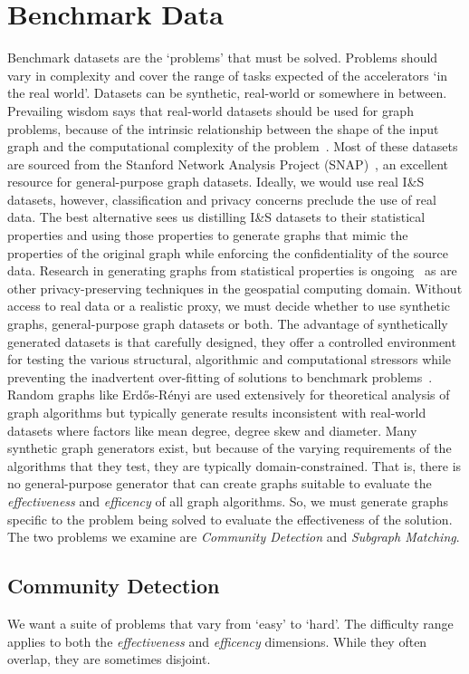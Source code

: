 \section{Benchmark Data}\label{section:datasets}
Benchmark datasets are the `problems' that must be solved.
Problems should vary in complexity and cover the range of tasks expected of the accelerators `in the real world'.
Datasets can be synthetic, real-world or somewhere in between.
Prevailing wisdom says that real-world datasets should be used for graph problems, because of the intrinsic relationship between the shape of the input graph and the computational complexity of the problem~\cite{Beamer2017}.
Most of these datasets are sourced from the Stanford Network Analysis Project (SNAP)~\cite{Leskovec2014}, an excellent resource for general-purpose graph datasets.
Ideally, we would use real I\&S datasets, however, classification and privacy concerns preclude the use of real data. 
The best alternative sees us distilling I\&S datasets to their statistical properties and using those properties to generate graphs that mimic the properties of the original graph while enforcing the confidentiality of the source data. 
Research in generating graphs from statistical properties is ongoing~\cite{Zahirnia2023} as are other privacy-preserving techniques in the geospatial computing domain.
Without access to real data or a realistic proxy, we must decide whether to use synthetic graphs, general-purpose graph datasets or both. 
The advantage of synthetically generated datasets is that carefully designed, they offer a controlled environment for testing the various structural, algorithmic and computational stressors while preventing the inadvertent over-fitting of solutions to benchmark problems~\cite{Hooker1994, Hooker1995}. 
Random graphs like Erd\H{o}s-R\'enyi are used extensively for theoretical analysis of graph algorithms but typically generate results inconsistent with real-world datasets where factors like mean degree, degree skew and diameter. 
Many synthetic graph generators exist, but because of the varying requirements of the algorithms that they test, they are typically domain-constrained. 
That is, there is no general-purpose generator that can create graphs suitable to evaluate the \textit{effectiveness} and \textit{efficency} of all graph algorithms. 
So, we must generate graphs specific to the problem being solved to evaluate the effectiveness of the solution. 
The two problems we examine are \textit{Community Detection} and \textit{Subgraph Matching}.

\subsection{Community Detection}
We want a suite of problems that vary from `easy' to `hard'.
The difficulty range applies to both the \textit{effectiveness} and \textit{efficency} dimensions. 
While they often overlap, they are sometimes disjoint. 

